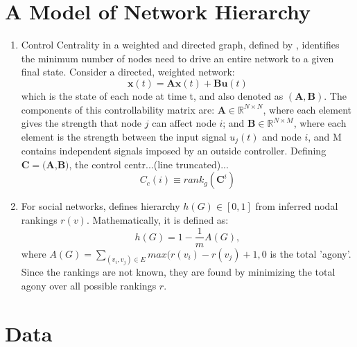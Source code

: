 \documentclass[3p,times]{elsarticle}
\begin{document}
\section{A Model of Network Hierarchy}

\begin{enumerate}
	\item Control Centrality in a weighted and directed graph, defined by \cite{Liu12}, identifies the minimum number of nodes need to drive an entire network to a given final state. Consider a directed, weighted network:
	$$
	\bm{x}(t) = \bm{Ax}(t) + \bm{Bu}(t)
	$$
	which is the state of each node at time t, and also denoted as \begin{math}(\bm{A},\bm{B})\end{math}. The components of this controllability matrix are: $\bm{A}\in \mathbb{R}^{N\times N}$, where each element gives the strength that node $j$ can affect node $i$; and $\bm{B}\in\mathbb{R}^{N\times M}$, where each element is the strength between the input signal $u_{j}(t)$ and node $i$, and M contains independent signals imposed by an outside controller. Defining $\bm{C} = (\bm{A}$,$\bm{B})$, the control centr...(line truncated)...
	$$
	C_{c}(i) \equiv rank_{g}(\bm{C}^{i})
	$$
	
	\item For social networks, \cite{online} defines hierarchy $h(G)\in[0,1]$ from inferred nodal rankings $r(v)$. Mathematically, it is defined as:
	$$
	h(G)=1-\frac{1}{m}A(G),
	$$ 
	where $A(G)=\sum_{(v_i,v_j)\in E} {max(r(v_i)-r(v_j)+1,0}$ is the total 'agony'. Since the rankings are not known, they are found by minimizing the total agony over all possible rankings $r$.
	
	\end{enumerate}
	
	
\section{Data}
\end{document}
